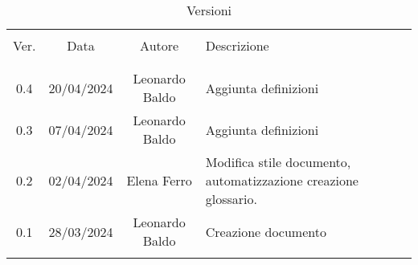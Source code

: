 \documentclass[italian,12pt]{article}
\begin{document}
    

    \newpage

    

\begin{table}[!h]
	\caption{Versioni}
	\begin{center}
		\begin{tabular}{ c c c p{9cm} }
			\hline                                                                                               \\[-2ex]
			Ver. & Data       & Autore         & Descrizione \\
			\\[-2ex] \hline \\[-1.5ex]
            0.4  & 20/04/2024 & Leonardo Baldo & Aggiunta definizioni \\
            0.3  & 07/04/2024 & Leonardo Baldo & Aggiunta definizioni \\
			0.2  & 02/04/2024 & Elena Ferro    & Modifica stile documento, automatizzazione creazione glossario. \\
			0.1  & 28/03/2024 & Leonardo Baldo & Creazione documento \\
			\\[-1.5ex] \hline
		\end{tabular}
	\end{center}
\end{table}

    \newpage
    \tableofcontents
    \printglossary[style=myaltlistgroup,title=]
\end{document}
